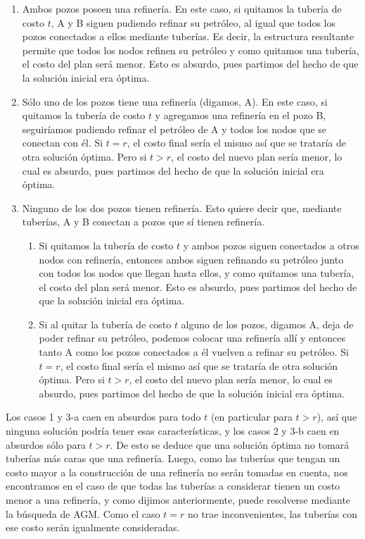 \begin{enumerate}
	\item Ambos pozos poseen una refinería. En este caso, si quitamos la tubería de costo $t$, A y B siguen pudiendo refinar su petróleo, al igual que todos los pozos conectados a ellos mediante tuberías. Es decir, la estructura resultante permite que todos los nodos refinen su petróleo y como quitamos una tubería, el costo del plan será menor.  Esto es absurdo, pues partimos del hecho de que la solución inicial era óptima.
	\item Sólo uno de los pozos tiene una refinería (digamos, A). En este caso, si quitamos la tubería de costo $t$ y agregamos una refinería en el pozo B, seguiríamos pudiendo refinar el petróleo de A y todos los nodos que se conectan con él. Si $t = r$, el costo final sería el mismo así que se trataría de otra solución óptima. Pero si $t > r$, el costo del nuevo plan sería menor, lo cual es absurdo, pues partimos del hecho de que la solución inicial era óptima.
	\item Ninguno de los dos pozos tienen refinería. Esto quiere decir que, mediante tuberías, A y B conectan a pozos que sí tienen refinería. 
	\begin{enumerate}
		\item Si quitamos la tubería de costo $t$ y ambos pozos siguen conectados a otros nodos con refinería, entonces ambos siguen refinando su petróleo junto con todos los nodos que llegan hasta ellos, y como quitamos una tubería, el costo del plan será menor.  Esto es absurdo, pues partimos del hecho de que la solución inicial era óptima.
		\item Si al quitar la tubería de costo $t$ alguno de los pozos, digamos A, deja de poder refinar su petróleo, podemos colocar una refinería allí y entonces tanto A como los pozos conectados a él vuelven a refinar su petróleo. Si $t = r$, el costo final sería el mismo así que se trataría de otra solución óptima. Pero si $t > r$, el costo del nuevo plan sería menor, lo cual es absurdo, pues partimos del hecho de que la solución inicial era óptima.
	\end{enumerate}
\end{enumerate}

Los casos 1 y 3-a caen en absurdos para todo $t$ (en particular para $t > r$), así que ninguna solución podría tener esas características, y los casos 2 y 3-b caen en absurdos sólo para $t > r$. De esto se deduce que una solución óptima no tomará tuberías más caras que una refinería. Luego, como las tuberías que tengan un costo mayor a la construcción de una refinería no serán tomadas en cuenta, nos encontramos en el caso de que todas las tuberías a considerar tienen un costo menor a una refinería, y como dijimos anteriormente, puede resolverse mediante la búsqueda de AGM.  Como el caso $t = r$ no trae inconvenientes, las tuberías con ese costo serán igualmente consideradas.


